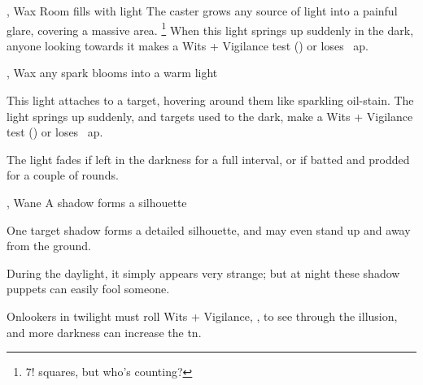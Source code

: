   {\mFire, \mAir}%
  {Wax}%
  {\duplicated}%
  {}%
  {Room fills with light}%
  {
    The caster grows any source of light into a painful glare, covering a massive area.%
    \footnote{$7!$ squares, but who's counting?}
    When this light springs up suddenly in the dark, anyone looking towards it makes a Wits + Vigilance test () or loses ~\gls{ap}.
  }

  {\mFire, \mAir}%
  {Wax}%
  {\detailed}%
  {}%
  {any spark blooms into a warm light}%
  {
    This light attaches to a target, hovering around them like sparkling oil-stain.
    The light springs up suddenly, and targets used to the dark, make a Wits + Vigilance test () or loses ~\gls{ap}.

    The light fades if left in the darkness for a full \gls{interval}, or if batted and prodded for a couple of rounds.
  }

  {\mFire, \mAir}%
  {Wane}%
  {\detailed}%
  {}%
  {A shadow forms a silhouette}%
  {
    One target shadow forms a detailed silhouette, and may even stand up and away from the ground.

    During the daylight, it simply appears very strange; but at night these shadow puppets can easily fool someone.

    \setcounter{track}{\value{spelllevel}}
    \addtocounter{track}{7}
    Onlookers in twilight must roll Wits + Vigilance, , to see through the illusion, and more darkness can increase the \gls{tn}.
  }

